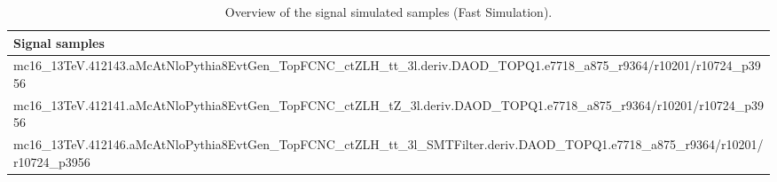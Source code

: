 \begin{table}[htbp]
	\caption{
		Overview of the signal simulated samples (Fast Simulation).
	}%
	\label{tab:mc_sig_nom}
	\notsotiny
	\centering
	\begin{adjustwidth}{-0.6cm}{}
	\begin{tabular}{l}
		\toprule
		\textbf{Signal samples} \\
		\hline
		mc16\_13TeV.412143.aMcAtNloPythia8EvtGen\_TopFCNC\_ctZLH\_tt\_3l.deriv.DAOD\_TOPQ1.e7718\_a875\_r9364/r10201/r10724\_p3956 \\
		mc16\_13TeV.412141.aMcAtNloPythia8EvtGen\_TopFCNC\_ctZLH\_tZ\_3l.deriv.DAOD\_TOPQ1.e7718\_a875\_r9364/r10201/r10724\_p3956 \\
		mc16\_13TeV.412146.aMcAtNloPythia8EvtGen\_TopFCNC\_ctZLH\_tt\_3l\_SMTFilter.deriv.DAOD\_TOPQ1.e7718\_a875\_r9364/r10201/r10724\_p3956 \\
		\bottomrule
		\end{tabular}
	 \end{adjustwidth}
\end{table}
	

